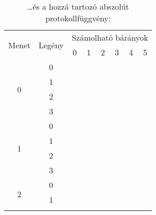 \documentclass{article}
\newcommand{\blk}{\cellcolor{darkgray}}
\newcommand{\red}{\cellcolor{red!33}}
\newcommand{\grn}{\cellcolor{green!33}}
\newcommand{\ylw}{\cellcolor{yellow}}
\newcommand{\nothing}{\text{\raisebox{0.4em}{\rotatebox{180}{$\curvearrowleft$}}}}%
\newcommand{\just}[1]{\boxed{#1}}%
\newcommand{\incl}{\mathbf{incl}}
\newcommand{\excl}{\mathbf{excl}}
\begin{document}
	\begin{table}[H]
		\caption*{\dots és a hozzá tartozó abszolút protokollfüggvény:}
		\begin{tabular}{c|c|c|c|c|c|c|c|}
			\multirow{2}{*}{Menet} &  \multirow{2}{*}{Legény}  &    \multicolumn{6}{c|}{Számolható bárányok}                                                          \\
				               &                           &    0              & 1              & 2              & 3              & 4              & 5              \\\hline\hline
			\multirow{4}{*}{0}     &  0                        &    \nothing       & \nothing       & \nothing       & \nothing       & \nothing       & \grn\just\incl \\\cline{2-8}
				               &  1                        &    \ylw\nothing   & \ylw\nothing   & \ylw\nothing   & \ylw\nothing   & \ylw\nothing   & \ylw\nothing   \\\cline{2-8}
				               &  2                        &    \red\just\excl & \nothing       & \nothing       & \nothing       & \nothing       & \grn\just\incl \\\cline{2-8}
				               &  3                        &    \ylw\nothing   & \ylw\nothing   & \ylw\nothing   & \ylw\nothing   & \ylw\nothing   & \ylw\nothing   \\\hline\hline
			\multirow{4}{*}{1}     &  0                        &    \red\just\excl & \nothing       & \nothing       & \nothing       & \grn\just\incl & \blk           \\\cline{2-8}
				               &  1                        &    \ylw\nothing   & \ylw\nothing   & \ylw\nothing   & \ylw\nothing   & \ylw\nothing   & \ylw           \\\cline{2-8}
				               &  2                        &    \blk           & \red\just\excl & \nothing       & \nothing       & \grn\just\incl & \blk           \\\cline{2-8}
				               &  3                        &    \ylw           & \ylw\nothing   & \ylw\nothing   & \ylw\nothing   & \ylw\nothing   & \ylw           \\\hline\hline
			\multirow{4}{*}{2}     &  0                        &    \blk           & \red\just\excl & \nothing       & \grn\just\incl & \blk           & \blk           \\\cline{2-8}
				               &  1                        &    \ylw           & \ylw\nothing   & \ylw\nothing   & \ylw\nothing   & \ylw           & \ylw           \\\cline{2-8}

\end{tabular}
\end{table}
\end{document}
